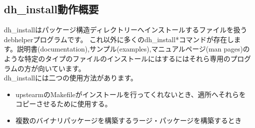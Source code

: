 \documentclass[mingoth,a4paper]{jsarticle}
\begin{document}
\subsection{dh\_install動作概要}

dh\_installはパッケージ構造ディレクトリーへインストールするファイルを扱うdebhelperプログラムです。
これ以外に多くのdh\_install*コマンドが存在します。説明書(documentation),サンプル(examples),マニュアルページ(man pages)のような特定のタイプのファイルのインストールにはするにはそれら専用のプログラムの方が向いています。
\\
dh\_installには二つの使用方法があります。
\begin{itemize}
\item upstearmのMakefileがインストールを行ってくれないとき、適所へそれらをコピーさせるために使用する。
\item 複数のバイナリパッケージを構築するラージ・パッケージを構築するとき
\end{itemize}

\end{document}
